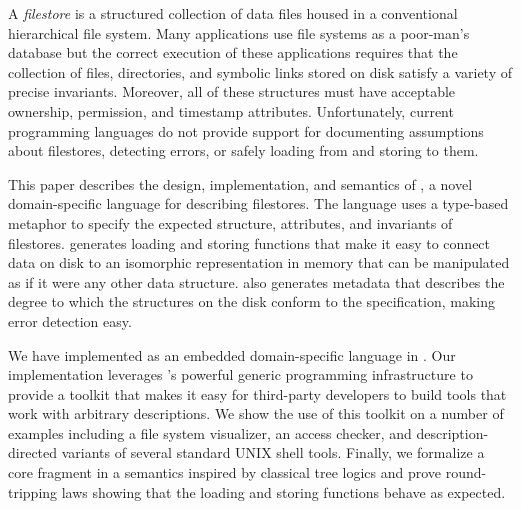 A {\em filestore} is a structured collection of data files housed in a
conventional hierarchical file system. Many applications use file
systems as a poor-man's database but the correct execution of these
applications requires that the collection of files, directories, and
symbolic links stored on disk satisfy a variety of precise
invariants. Moreover, all of these structures must have acceptable
ownership, permission, and timestamp attributes. Unfortunately,
current programming languages do not provide support for documenting
assumptions about filestores, detecting errors, or safely loading from
and storing to them.

This paper describes the design, implementation, and semantics of
\forest{}, a novel domain-specific language for describing
filestores. The language uses a type-based metaphor to specify the
expected structure, attributes, and invariants of filestores.
\forest{} generates loading and storing functions that make it easy to
connect data on disk to an isomorphic representation in memory that
can be manipulated as if it were any other data structure.  \forest{}
also generates metadata that describes the degree to which the
structures on the disk conform to the specification, making error
detection easy.

We have implemented \forest{} as an embedded domain-specific language
in \haskell{}. Our implementation leverages \haskell{}'s powerful
generic programming infrastructure to provide a toolkit that makes it
easy for third-party developers to build tools that work with
arbitrary \forest{} descriptions.  We show the use of this toolkit on
a number of examples including a file system visualizer, an access
checker, and description-directed variants of several standard UNIX
shell tools. Finally, we formalize a core fragment \forest{} in a
semantics inspired by classical tree logics and prove round-tripping
laws showing that the loading and storing functions behave as
expected.
